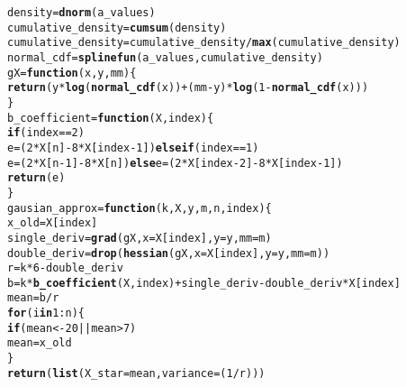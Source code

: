 \documentclass[12pt]{article}\usepackage[]{graphicx}\usepackage[]{color}
\makeatletter
\newcommand{\hlnum}[1]{\textcolor[rgb]{0.686,0.059,0.569}{#1}}%
\newcommand{\hlopt}[1]{\textcolor[rgb]{0,0,0}{#1}}%
\newcommand{\hlstd}[1]{\textcolor[rgb]{0.345,0.345,0.345}{#1}}%
\newcommand{\hlkwa}[1]{\textcolor[rgb]{0.161,0.373,0.58}{\textbf{#1}}}%
\newcommand{\hlkwb}[1]{\textcolor[rgb]{0.69,0.353,0.396}{#1}}%
\newcommand{\hlkwc}[1]{\textcolor[rgb]{0.333,0.667,0.333}{#1}}%
\newcommand{\hlkwd}[1]{\textcolor[rgb]{0.737,0.353,0.396}{\textbf{#1}}}%
\newenvironment{kframe}{%
 \def\at@end@of@kframe{}%
 \ifinner\ifhmode%
  \def\at@end@of@kframe{\end{minipage}}%
  \begin{minipage}{\columnwidth}%
 \fi\fi%
 \def\FrameCommand##1{\hskip\@totalleftmargin \hskip-\fboxsep
 \colorbox{shadecolor}{##1}\hskip-\fboxsep
     \hskip-\linewidth \hskip-\@totalleftmargin \hskip\columnwidth}%
 \MakeFramed {\advance\hsize-\width
   \@totalleftmargin\z@ \linewidth\hsize
   \@setminipage}}%
 {\par\unskip\endMakeFramed%
 \at@end@of@kframe}
\newenvironment{knitrout}{}{} %
\makeatother
\begin{document}
\begin{knitrout}
\begin{kframe}
\begin{alltt}
\hlstd{density} \hlkwb{=} \hlkwd{dnorm}\hlstd{(a_values)}
\hlstd{cumulative_density} \hlkwb{=} \hlkwd{cumsum}\hlstd{(density)}
\hlstd{cumulative_density} \hlkwb{=} \hlstd{cumulative_density}\hlopt{/}\hlkwd{max}\hlstd{(cumulative_density)}
\hlstd{normal_cdf} \hlkwb{=} \hlkwd{splinefun}\hlstd{(a_values, cumulative_density)}
\hlstd{gX} \hlkwb{=} \hlkwa{function}\hlstd{(}\hlkwc{x}\hlstd{,} \hlkwc{y}\hlstd{,} \hlkwc{mm}\hlstd{) \{}
    \hlkwd{return}\hlstd{(y} \hlopt{*} \hlkwd{log}\hlstd{(}\hlkwd{normal_cdf}\hlstd{(x))} \hlopt{+} \hlstd{(mm} \hlopt{-} \hlstd{y)} \hlopt{*} \hlkwd{log}\hlstd{(}\hlnum{1} \hlopt{-} \hlkwd{normal_cdf}\hlstd{(x)))}
\hlstd{\}}
\hlstd{b_coefficient} \hlkwb{=} \hlkwa{function}\hlstd{(}\hlkwc{X}\hlstd{,} \hlkwc{index}\hlstd{) \{}
    \hlkwa{if} \hlstd{(index} \hlopt{==} \hlnum{2}\hlstd{)}
        \hlstd{e} \hlkwb{=} \hlstd{(}\hlnum{2} \hlopt{*} \hlstd{X[n]} \hlopt{-} \hlnum{8} \hlopt{*} \hlstd{X[index} \hlopt{-} \hlnum{1}\hlstd{])} \hlkwa{else if} \hlstd{(index} \hlopt{==} \hlnum{1}\hlstd{)}
        \hlstd{e} \hlkwb{=} \hlstd{(}\hlnum{2} \hlopt{*} \hlstd{X[n} \hlopt{-} \hlnum{1}\hlstd{]} \hlopt{-} \hlnum{8} \hlopt{*} \hlstd{X[n])} \hlkwa{else} \hlstd{e} \hlkwb{=} \hlstd{(}\hlnum{2} \hlopt{*} \hlstd{X[index} \hlopt{-} \hlnum{2}\hlstd{]} \hlopt{-} \hlnum{8} \hlopt{*} \hlstd{X[index} \hlopt{-} \hlnum{1}\hlstd{])}
    \hlkwd{return}\hlstd{(e)}
\hlstd{\}}
\hlstd{gausian_approx} \hlkwb{=} \hlkwa{function}\hlstd{(}\hlkwc{k}\hlstd{,} \hlkwc{X}\hlstd{,} \hlkwc{y}\hlstd{,} \hlkwc{m}\hlstd{,} \hlkwc{n}\hlstd{,} \hlkwc{index}\hlstd{) \{}
    \hlstd{x_old} \hlkwb{=} \hlstd{X[index]}
    \hlstd{single_deriv} \hlkwb{=} \hlkwd{grad}\hlstd{(gX,} \hlkwc{x} \hlstd{= X[index],} \hlkwc{y} \hlstd{= y,} \hlkwc{mm} \hlstd{= m)}
    \hlstd{double_deriv} \hlkwb{=} \hlkwd{drop}\hlstd{(}\hlkwd{hessian}\hlstd{(gX,} \hlkwc{x} \hlstd{= X[index],} \hlkwc{y} \hlstd{= y,} \hlkwc{mm} \hlstd{= m))}
    \hlstd{r} \hlkwb{=} \hlstd{k} \hlopt{*} \hlnum{6} \hlopt{-} \hlstd{double_deriv}
    \hlstd{b} \hlkwb{=} \hlstd{k} \hlopt{*} \hlkwd{b_coefficient}\hlstd{(X, index)} \hlopt{+} \hlstd{single_deriv} \hlopt{-} \hlstd{double_deriv} \hlopt{*} \hlstd{X[index]}
    \hlstd{mean} \hlkwb{=} \hlstd{b}\hlopt{/}\hlstd{r}
    \hlkwa{for} \hlstd{(i} \hlkwa{in} \hlnum{1}\hlopt{:}\hlstd{n) \{}
        \hlkwa{if} \hlstd{(mean} \hlopt{< -}\hlnum{20} \hlopt{||} \hlstd{mean} \hlopt{>} \hlnum{7}\hlstd{)}
            \hlstd{mean} \hlkwb{=} \hlstd{x_old}
    \hlstd{\}}
    \hlkwd{return}\hlstd{(}\hlkwd{list}\hlstd{(}\hlkwc{X_star} \hlstd{= mean,} \hlkwc{variance} \hlstd{= (}\hlnum{1}\hlopt{/}\hlstd{r)))}

\end{alltt}
\end{kframe}
\end{knitrout}
\end{document}
